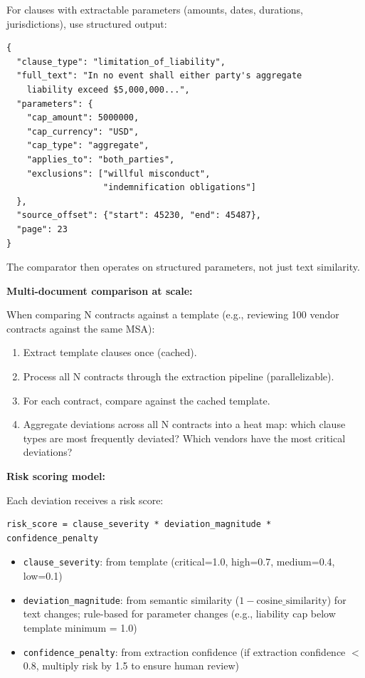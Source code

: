 For clauses with extractable parameters (amounts, dates, durations, jurisdictions), use structured output:

\begin{verbatim}
{
  "clause_type": "limitation_of_liability",
  "full_text": "In no event shall either party's aggregate
    liability exceed $5,000,000...",
  "parameters": {
    "cap_amount": 5000000,
    "cap_currency": "USD",
    "cap_type": "aggregate",
    "applies_to": "both_parties",
    "exclusions": ["willful misconduct",
                   "indemnification obligations"]
  },
  "source_offset": {"start": 45230, "end": 45487},
  "page": 23
}
\end{verbatim}

The comparator then operates on structured parameters, not just text similarity.

\textbf{Multi-document comparison at scale:}

When comparing N contracts against a template (e.g., reviewing 100 vendor contracts against the same MSA):

\begin{enumerate}
  \item Extract template clauses once (cached).
  \item Process all N contracts through the extraction pipeline (parallelizable).
  \item For each contract, compare against the cached template.
  \item Aggregate deviations across all N contracts into a heat map: which clause types are most frequently deviated? Which vendors have the most critical deviations?
\end{enumerate}

\textbf{Risk scoring model:}

Each deviation receives a risk score:

\begin{verbatim}
risk_score = clause_severity * deviation_magnitude * confidence_penalty
\end{verbatim}

\begin{itemize}
  \item \texttt{clause\_severity}: from template (critical=1.0, high=0.7, medium=0.4, low=0.1)
  \item \texttt{deviation\_magnitude}: from semantic similarity ($1 - \text{cosine\_similarity}$) for text changes; rule-based for parameter changes (e.g., liability cap below template minimum = 1.0)
  \item \texttt{confidence\_penalty}: from extraction confidence (if extraction confidence $<$ 0.8, multiply risk by 1.5 to ensure human review)
\end{itemize}


